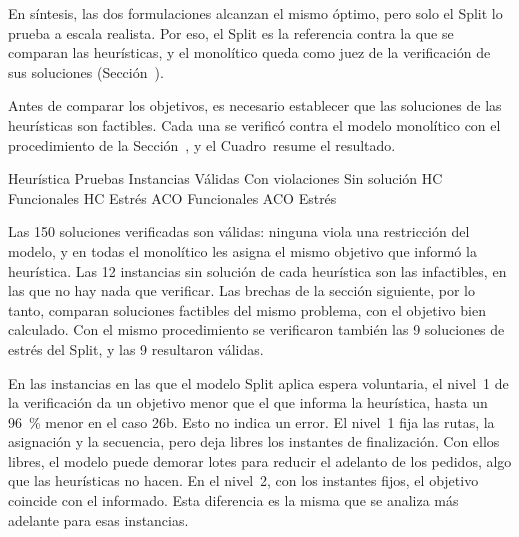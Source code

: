 En síntesis, las dos formulaciones alcanzan el mismo óptimo, pero solo el
Split lo prueba a escala realista. Por eso, el Split es la referencia contra
la que se comparan las heurísticas, y el monolítico queda como juez de la
verificación de sus soluciones (Sección~).

\stopsubsection

\stopsection

\startsection[title={Validez de las soluciones de las heurísticas}, reference=sec:validez_resultados]

Antes de comparar los objetivos, es necesario establecer que las soluciones
de las heurísticas son factibles. Cada una se verificó contra el modelo monolítico
con el procedimiento de la Sección~, y el
Cuadro~ resume el resultado.

\startplacetable[reference=tab:res_validez, location=here, title={Resultado de la verificación de las soluciones de las heurísticas contra el modelo monolítico.}]
	\bTABLE[split=yes, align=middle, frame=on, width=fit]
	\setupTABLE[row][1][background=color, backgroundcolor=darkgray, style=bold]
	\setupTABLE[column][3,4,5,6][align=flushright]
	\bTR \bTH Heurística \eTH \bTH Pruebas \eTH \bTH Instancias \eTH \bTH Válidas \eTH \bTH Con violaciones \eTH \bTH Sin solución \eTH \eTR
	\bTR \bTD HC \eTD \bTD Funcionales \eTD {} \eTD {} \eTD {} \eTD {} \eTD \eTR
	\bTR \bTD HC \eTD \bTD Estrés \eTD {} \eTD {} \eTD {} \eTD {} \eTD \eTR
	\bTR \bTD ACO \eTD \bTD Funcionales \eTD {} \eTD {} \eTD {} \eTD {} \eTD \eTR
	\bTR \bTD ACO \eTD \bTD Estrés \eTD {} \eTD {} \eTD {} \eTD {} \eTD \eTR
	\eTABLE
\stopplacetable

Las 150 soluciones verificadas son válidas: ninguna viola una restricción del
modelo, y en todas el monolítico les asigna el mismo objetivo que informó la
heurística. Las 12 instancias sin solución de cada heurística son las
infactibles, en las que no hay nada que verificar. Las brechas de la sección
siguiente, por lo tanto, comparan soluciones factibles del mismo problema,
con el objetivo bien calculado. Con el mismo procedimiento se verificaron
también las 9 soluciones de estrés del Split, y las 9 resultaron válidas.

En las instancias en las que el modelo Split aplica espera voluntaria,
el nivel~1 de la verificación da un objetivo menor que
el que informa la heurística, hasta un 96~\% menor en el caso 26b. Esto no
indica un error. El nivel~1 fija las rutas, la asignación y la secuencia,
pero deja libres los instantes de finalización. Con ellos libres, el modelo
puede demorar lotes para reducir el adelanto de los pedidos, algo que las
heurísticas no hacen. En el nivel~2, con los
instantes fijos, el objetivo coincide con el informado. Esta diferencia es
la misma que se analiza más adelante para esas instancias.


